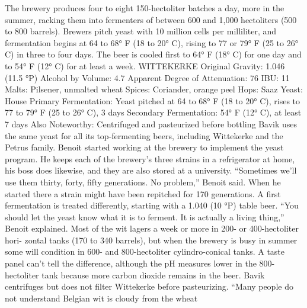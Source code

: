 \documentclass[a4paper,parskip=half]{scrartcl}
\begin{document}
The brewery produces four to eight 150-hectoliter batches a day,
more in the summer, racking them into fermenters of between 600 and
1,000 hectoliters (500 to 800 barrels). Brewers pitch yeast with 10 million
cells per milliliter, and fermentation begins at 64 to 68° F (18 to 20° C),
rising to 77 or 79° F (25 to 26° C) in three to four days. The beer is cooled
first to 64° F (18° C) for one day and to 54° F (12° C) for at least a week.
WITTEKERKE
Original Gravity: 1.046 (11.5 °P)
Alcohol by Volume: 4.7%
Apparent Degree of Attenuation: 76%
IBU: 11
Malts: Pilsener, unmalted wheat
Spices: Coriander, orange peel
Hops: Saaz
Yeast: House
Primary Fermentation: Yeast pitched at 64 to 68° F (18 to 20° C), rises to 77
to 79° F (25 to 26° C), 3 days
Secondary Fermentation: 54° F (12° C), at least 7 days
Also Noteworthy: Centrifuged and pasteurized before bottling
Bavik uses the same yeast for all its top-fermenting beers, including
Wittekerke and the Petrus family. Benoit started working at the brewery
to implement the yeast program. He keeps each of the brewery’s three
strains in a refrigerator at home, his boss does likewise, and they are
also stored at a university. “Sometimes we’ll use them thirty, forty, fifty
generations. No problem,” Benoit said. When he started there a strain
might have been repitched for 170 generations.
A first fermentation is treated differently, starting with a 1.040 (10
°P) table beer. “You should let the yeast know what it is to ferment. It is
actually a living thing,” Benoit explained.
Most of the wit lagers a week or more in 200- or 400-hectoliter hori-
zontal tanks (170 to 340 barrels), but when the brewery is busy in summer
some will condition in 600- and 800-hectoliter cylindro-conical tanks. A
taste panel can’t tell the difference, although the pH measures lower in
the 800-hectoliter tank because more carbon dioxide remains in the beer.
Bavik centrifuges but does not filter Wittekerke before pasteurizing.
“Many people do not understand Belgian wit is cloudy from the wheat

\parencite[64]{Hieronymus2010}
\end{document}
